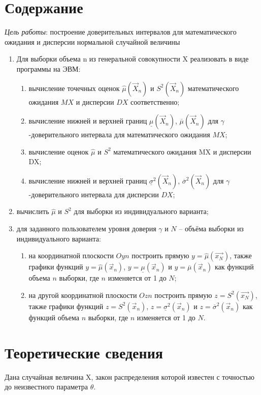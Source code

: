 
\chapter{Содержание}

\textit{Цель работы}:  построение доверительных интервалов для математического ожидания и дисперсии нормальной случайной величины
\begin{enumerate}[wide=0pt]
	\item Для выборки объема n из генеральной совокупности X реализовать в виде программы на ЭВМ:
	\begin{enumerate}
		\item вычисление точечных оценок $\hat\mu(\vec X_n)$ и $S^2(\vec X_n)$ математического ожидания $MX$ и дисперсии $DX$ соответственно;
		\item вычисление нижней и верхней границ $\underline\mu(\vec X_n)$, $\overline\mu(\vec X_n)$ для $\gamma$-доверительного интервала для математического ожидания $MX$;
		\item вычисление оценок $\hat{\mu}$ и $S^2$ математического ожидания MX и дисперсии DX;
		\item вычисление нижней и верхней границ $\underline\sigma^2(\vec X_n)$, $\overline\sigma^2(\vec X_n)$ для $\gamma$-доверительного интервала для дисперсии $DX$;
	\end{enumerate}
	\item вычислить $\hat\mu$ и $S^2$ для выборки из индивидуального варианта;
	\item для заданного пользователем уровня доверия $\gamma$ и $N$ – объёма выборки из индивидуального варианта:
	\begin{enumerate}
		\item на координатной плоскости $Oyn$ построить прямую $y = \hat\mu(\vec{x_N})$, также графики функций $y = \hat\mu(\vec x_n)$, $y = \underline\mu(\vec x_n)$ и $y = \overline\mu(\vec x_n)$ как функций объема $n$ выборки, где $n$ изменяется от 1 до $N$;
		\item на другой координатной плоскости $Ozn$ построить прямую $z = S^2(\vec{x_N})$, также графики функций $z = S^2(\vec x_n)$, $z = \underline\sigma^2(\vec x_n)$ и $z = \overline\sigma^2(\vec x_n)$ как функций объема $n$ выборки, где $n$ изменяется от 1 до $N$.
	\end{enumerate}
\end{enumerate}

\chapter{Теоретические сведения}
Дана случайная величина X, закон распределения которой известен с точностью до неизвестного параметра $\theta$. 

